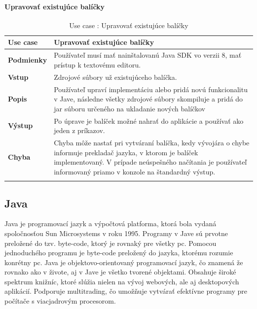 \paragraph{Upravovať existujúce balíčky}
\begin{center}
	\begin{longtable}{|p{2.5cm}|p{12.2cm}|}
		
			\hline
			\textbf{Use case} & Upravovať existujúce balíčky \\ 
			\hline
			\textbf{Podmienky} &  Používateľ musí mať nainštalovanú Java SDK vo verzii 8, mať prístup k textovému editoru.  \\ 
			\hline
			\textbf{Vstup} & Zdrojové súbory už existujúceho balíčka.\\
			\hline
			\textbf{Popis} & Používateľ upraví implementáciu alebo pridá novú funkcionalitu v Jave, následne všetky zdrojové súbory skompiluje a pridá do \acrshort{jar} súboru určeného na ukladanie nových balíčkov\\ 
			\hline
			\textbf{Výstup} & Po úprave je balíček možné nahrať do aplikácie a používať ako jeden z príkazov.\\
			\hline
			\textbf{Chyba} & Chyba môže nastať pri vytváraní balíčka, kedy vývojára o chybe informuje prekladač jazyka, v ktorom je balíček implementovaný. V prípade neúspešného načítania je používateľ informovaný priamo v konzole na štandardný výstup.\\
			\hline
		\caption{Use case : Upravovať existujúce balíčky}
		\label{table:1}
		
	\end{longtable}
\end{center}
\subsection{Java}
\indent Java je programovací jazyk a výpočtová platforma, ktorá bola vydaná spoločnosťou Sun Microsystems v roku 1995. \cite{java} 
Programy v Jave sú prvotne preložené do tzv. byte-code, ktorý je rovnaký pre všetky \acrshort{pc}. Pomocou jednoduchého programu je byte-code preložený do jazyka, ktorému rozumie konrétny \acrshort{pc}.
Java je objektovo-orientovaný programovací jazyk, čo znamená že rovnako ako v živote, aj v Jave je všetko tvorené objektami. Obsahuje široké spektrum knižníc, ktoré slúžia nielen na vývoj webových, ale aj desktopových aplikácií.
Podporuje multitrading, čo umožňuje vytvárať efektívne programy pre počítače s viacjadrovým procesorom.\cite{javabook}


